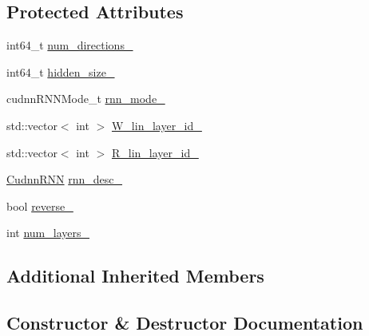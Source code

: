 \subsection*{Protected Attributes}
\begin{DoxyCompactItemize}
\item 
int64\+\_\+t \mbox{\hyperlink{classonnxruntime_1_1cuda_1_1CudnnRnnBase_a8bce1f099dd2137878ca7076ee778768}{num\+\_\+directions\+\_\+}}
\item 
int64\+\_\+t \mbox{\hyperlink{classonnxruntime_1_1cuda_1_1CudnnRnnBase_a356775ca69710062927763d8caf012fc}{hidden\+\_\+size\+\_\+}}
\item 
cudnn\+R\+N\+N\+Mode\+\_\+t \mbox{\hyperlink{classonnxruntime_1_1cuda_1_1CudnnRnnBase_a4d560327ff9db8d163c70c1db681ae2c}{rnn\+\_\+mode\+\_\+}}
\item 
std\+::vector$<$ int $>$ \mbox{\hyperlink{classonnxruntime_1_1cuda_1_1CudnnRnnBase_a5238bfaa798ff8e995650b1239ec1562}{W\+\_\+lin\+\_\+layer\+\_\+id\+\_\+}}
\item 
std\+::vector$<$ int $>$ \mbox{\hyperlink{classonnxruntime_1_1cuda_1_1CudnnRnnBase_ac8928d0f3f1a61979c26ed046a8521ce}{R\+\_\+lin\+\_\+layer\+\_\+id\+\_\+}}
\item 
\mbox{\hyperlink{classonnxruntime_1_1cuda_1_1CudnnRNN}{Cudnn\+R\+NN}} \mbox{\hyperlink{classonnxruntime_1_1cuda_1_1CudnnRnnBase_aa8c1a73fe24936e85ebed992805d02b3}{rnn\+\_\+desc\+\_\+}}
\item 
bool \mbox{\hyperlink{classonnxruntime_1_1cuda_1_1CudnnRnnBase_a9f4414feb5fdb7391741be9f4546293b}{reverse\+\_\+}}
\item 
int \mbox{\hyperlink{classonnxruntime_1_1cuda_1_1CudnnRnnBase_afcd51336238a0ff10b7132b3b6d6407d}{num\+\_\+layers\+\_\+}}
\end{DoxyCompactItemize}
\subsection*{Additional Inherited Members}


\subsection{Constructor \& Destructor Documentation}
\mbox{\label{classonnxruntime_1_1cuda_1_1CudnnRnnBase_a202c5560e8d830d451742ce7fb05a867}} 

